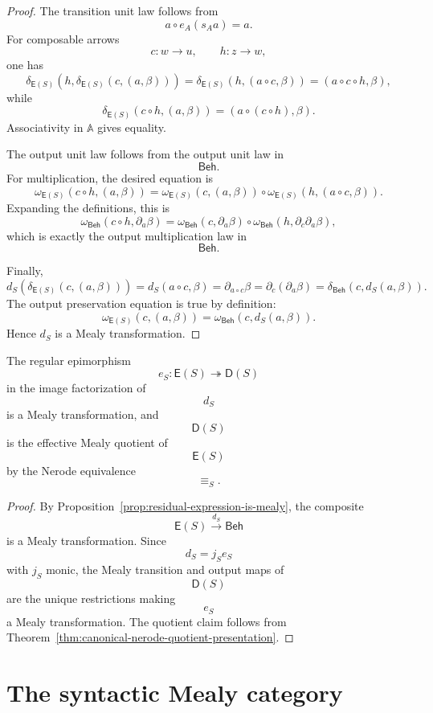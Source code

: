 \begin{proof}
The transition unit law follows from
\[
a\circ e_A(s_Aa)=a.
\]
For composable arrows
\[
c:w\to u,
\qquad
h:z\to w,
\]
one has
\[
\delta_{\mathsf E(S)}(h,\delta_{\mathsf E(S)}(c,(a,\beta)))
=
\delta_{\mathsf E(S)}(h,(a\circ c,\beta))
=
(a\circ c\circ h,\beta),
\]
while
\[
\delta_{\mathsf E(S)}(c\circ h,(a,\beta))
=
(a\circ(c\circ h),\beta).
\]
Associativity in \(\mathbb A\) gives equality.

The output unit law follows from the output unit law in
\[
\mathsf{Beh}.
\]
For multiplication, the desired equation is
\[
\omega_{\mathsf E(S)}(c\circ h,(a,\beta))
=
\omega_{\mathsf E(S)}(c,(a,\beta))
\circ
\omega_{\mathsf E(S)}(h,(a\circ c,\beta)).
\]
Expanding the definitions, this is
\[
\omega_{\mathsf{Beh}}(c\circ h,\partial_a\beta)
=
\omega_{\mathsf{Beh}}(c,\partial_a\beta)
\circ
\omega_{\mathsf{Beh}}(h,\partial_c\partial_a\beta),
\]
which is exactly the output multiplication law in
\[
\mathsf{Beh}.
\]

Finally,
\[
d_S(\delta_{\mathsf E(S)}(c,(a,\beta)))
=
d_S(a\circ c,\beta)
=
\partial_{a\circ c}\beta
=
\partial_c(\partial_a\beta)
=
\delta_{\mathsf{Beh}}(c,d_S(a,\beta)).
\]
The output preservation equation is true by definition:
\[
\omega_{\mathsf E(S)}(c,(a,\beta))
=
\omega_{\mathsf{Beh}}(c,d_S(a,\beta)).
\]
Hence \(d_S\) is a Mealy transformation.
\end{proof}

\begin{corollary}
\label{cor:residual-expression-quotient-mealy}
The regular epimorphism
\[
e_S:\mathsf E(S)\twoheadrightarrow\mathsf D(S)
\]
in the image factorization of
\[
d_S
\]
is a Mealy transformation, and
\[
\mathsf D(S)
\]
is the effective Mealy quotient of
\[
\mathsf E(S)
\]
by the Nerode equivalence
\[
{\equiv_S}.
\]
\end{corollary}

\begin{proof}
By Proposition~\ref{prop:residual-expression-is-mealy}, the composite
\[
\mathsf E(S)
\xrightarrow{d_S}
\mathsf{Beh}
\]
is a Mealy transformation. Since
\[
d_S
=
j_S e_S
\]
with \(j_S\) monic, the Mealy transition and output maps of
\[
\mathsf D(S)
\]
are the unique restrictions making
\[
e_S
\]
a Mealy transformation. The quotient claim follows from
Theorem~\ref{thm:canonical-nerode-quotient-presentation}.
\end{proof}

\section{The syntactic Mealy category}
\label{sec:syntactic-mealy-category}

